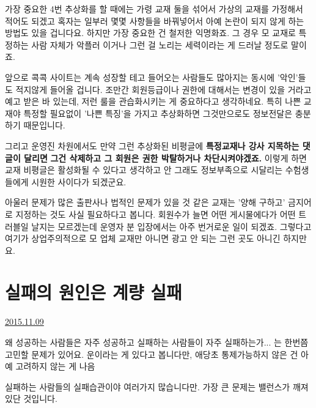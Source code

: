 가장 중요한 4번 추상화를 할 때에는 가령 교재 둘을 섞어서 가상의 교재를 가정해서 적어도 되겠고
혹자는 일부러 몇몇 사항들을 바꿔넣어서 아예 논란이 되지 않게 하는 방법도 있을 겁니다요.
하지만 가장 중요한 건 철저한 익명화죠. 그 경우 모 교재로 특정하는 사람 자체가 악플러 이거나 그런 걸 노리는 세력이라는 게 드러날 정도로 말이죠.
\vspace{5mm}

앞으로 콕콕 사이트는 계속 성장할 테고 들어오는 사람들도 많아지는 동시에 '악인'들도 적지않게 들어올 겁니다.
조만간 회원등급이나 권한에 대해서는 변경이 있을 거라고 예고 받은 바 있는데, 저런 룰을 관습화시키는 게 중요하다고 생각하네요.
특히 나쁜 교재야 특정할 필요없이 '나쁜 특징'을 가지고 추상화하면 그것만으로도 정보전달은 충분하기 때문입니다.
\vspace{5mm}

그리고 운영진 차원에서도 만약 그런 추상화된 비평글에 \textbf{특정교재나 강사 지목하는  댓글이 달리면}
\textbf{그건 삭제하고 그 회원은 권한 박탈하거나 차단시켜야겠죠.}
이렇게 하면 교재 비평글은 활성화될 수 있다고 생각하고
안 그래도 정보부족으로 시달리는 수험생들에게 시원한 사이다가 되겠군요.
\vspace{5mm}

아울러 문제가 많은 출판사나 법적인 문제가 있을 것 같은 교재는 '양해 구하고' 금지어로 지정하는 것도 사실 필요하다고 봅니다.
회원수가 늘면 어떤 게시물에다가 어떤 트러블일 날지는 모르겠는데 운영자 분 입장에서는 아주 번거로운 일이 되겠죠.
그렇다고 여기가 상업주의적으로 모 업체 교재만 아니면 광고 안 되는 그런 곳도 아니긴 하지만요.
\vspace{5mm}








\section{실패의 원인은 계량 실패}
\href{https://www.kockoc.com/Apoc/472231}{2015.11.09}

\vspace{5mm}

왜 성공하는 사람들은 자주 성공하고 실패하는 사람들이 자주 실패하는가... 는 한번쯤 고민할 문제가 있어요.
운이라는 게 있다고 봅니다만, 애당초 통제가능하지 않은 건 아예 고려하지 않는 게 나음
\vspace{5mm}

실패하는 사람들의 실패습관이야 여러가지 많습니다만.
가장 큰 문제는 밸런스가 깨져있단 것입니다.
\vspace{5mm}

